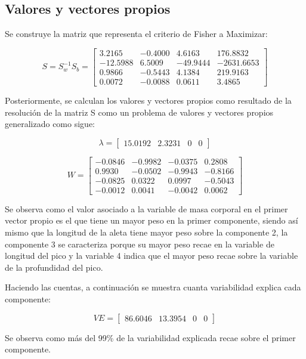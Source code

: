 \documentclass[11pt, letterpaper]{article}
\begin{document}
\newpage


\subsection{Valores y vectores propios}

Se construye la matriz que representa el criterio de Fisher a Maximizar:

$$S = S_w^{-1}S_b = 
\begin{bmatrix}
3.2165 & -0.4000 & 4.6163 & 176.8832 \\
-12.5988 & 6.5009 & -49.9444 & -2631.6653 \\
0.9866 & -0.5443 & 4.1384 & 219.9163 \\
0.0072 & -0.0088 & 0.0611 & 3.4865
\end{bmatrix}
$$

Posteriormente, se calculan los valores y vectores propios como resultado de la resolución de la matriz S como un problema de valores y vectores propios generalizado como sigue:

$$\lambda = 
\begin{bmatrix}
	15.0192 &
	2.3231 &
	0 &
	0 
\end{bmatrix}
$$

$$ W = 
\begin{bmatrix}
-0.0846 & -0.9982 & -0.0375 & 0.2808 \\
0.9930 & -0.0502 & -0.9943 & -0.8166 \\
-0.0825 & 0.0322 & 0.0997 & -0.5043 \\
-0.0012 & 0.0041 & -0.0042 & 0.0062
\end{bmatrix}
$$

Se observa como el valor asociado a la variable de masa corporal en el primer vector propio es el que tiene un mayor peso en la primer componente, siendo así mismo que la longitud de la aleta tiene mayor peso sobre la componente 2, la componente 3 se caracteriza porque su mayor peso recae en la variable de longitud del pico y la variable 4 indica que el mayor peso recae sobre la variable de la profundidad del pico.

Haciendo las cuentas, a continuación se muestra cuanta variabilidad explica cada componente:

$$VE = 
\begin{bmatrix}
	86.6046  &
	13.3954  &
	0 &
	0 
\end{bmatrix}
$$



Se observa como más del 99\% de la variabilidad explicada recae sobre el primer componente.
\end{document}
